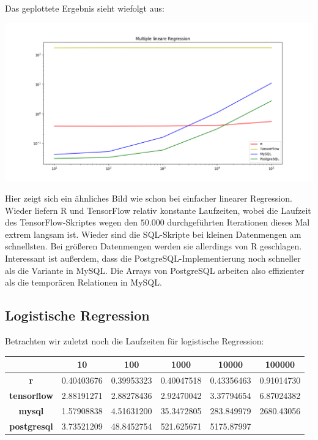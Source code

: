 Das geplottete Ergebnis sieht wiefolgt aus:

\includegraphics[width=\textwidth]{multipleLinearRegressionBenchmark}

Hier zeigt sich ein ähnliches Bild wie schon bei einfacher linearer Regression. Wieder liefern R und TensorFlow relativ konstante Laufzeiten, wobei die Laufzeit des TensorFlow-Skriptes wegen den $50.000$ durchgeführten Iterationen dieses Mal extrem langsam ist. Wieder sind die SQL-Skripte bei kleinen Datenmengen am schnellsten. Bei größeren Datenmengen werden sie allerdings von R geschlagen. Interessant ist außerdem, dass die PostgreSQL-Implementierung noch schneller als die Variante in MySQL. Die Arrays von PostgreSQL arbeiten also effizienter als die temporären Relationen in MySQL.

\subsection{Logistische Regression}
\label{subsection:4:1:3}

Betrachten wir zuletzt noch die Laufzeiten für logistische Regression:

\begin{center}
  \begin{tabular}{|c|c|c|c|c|c|}\hline
    & \textbf{10} & \textbf{100} & \textbf{1000} & \textbf{10000} & \textbf{100000} \\ \hline
    \textbf{r} & 0.40403676 & 0.39953323 & 0.40047518 & 0.43356463 & 0.91014730 \\ \hline
    \textbf{tensorflow} & 2.88191271 & 2.88278436 & 2.92470042 & 3.37794654 & 6.87024382 \\ \hline
    \textbf{mysql} & 1.57908838 & 4.51631200 & 35.3472805 & 283.849979 & 2680.43056 \\ \hline
    \textbf{postgresql} & 3.73521209 & 48.8452754 & 521.625671 & 5175.87997 &  \\ \hline
  \end{tabular}
\end{center}


